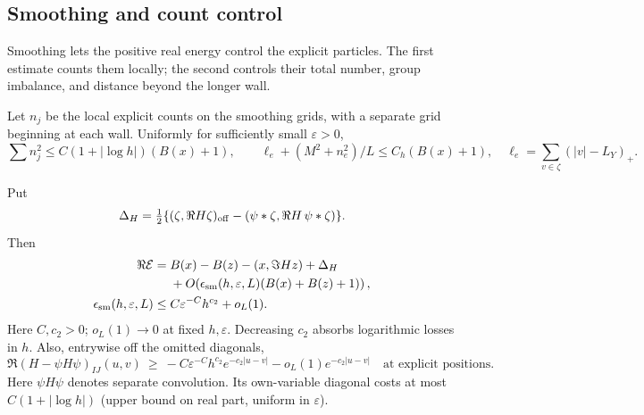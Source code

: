 \subsection{Smoothing and count control}

Smoothing lets the positive real energy control the explicit particles.
The first estimate counts them locally; the second controls their total
number, group imbalance, and distance beyond the longer wall.

\begin{lemma}\label{lem:07_magnetic_analysis-smoothing}
Let \(n_j\) be the local explicit counts on the smoothing grids, with a separate grid beginning at each wall. Uniformly for sufficiently small \(\varepsilon>0\),
\begin{equation}
 \sum n_j^2\le C(1+|\log h|)(B(x)+1),\qquad
 \ell_e+(M^2+n_e^2)/L\le C_h (B(x)+1),
 \quad\ell_e=\sum_{v\in\zeta}(|v|-L_Y)_+ .
 \label{eq:M-20}
\end{equation}


Put
\[
 \Delta_H=\tfrac12\{(\zeta,\Re H\zeta)_{\rm off}
                      -(\psi*\zeta,\Re H\,\psi*\zeta)\}.
\]
Then
\begin{equation}
\begin{aligned}
 \Re\mathcal E={}&B(x)-B(z)-(x,\Im H z)+\Delta_H
     \\ &+O\!\left(\epsilon_{\rm sm}(h,\varepsilon,L)(B(x)+B(z)+1)\right),\\
 \epsilon_{\rm sm}(h,\varepsilon,L)\le{}& C\varepsilon^{-C}h^{c_2}+o_L(1).
\end{aligned}
 \label{eq:M-21}
\end{equation}
Here \(C,c_2>0\); \(o_L(1)\to0\) at fixed \(h,\varepsilon\). Decreasing \(c_2\) absorbs logarithmic losses in \(h\). Also, entrywise off the omitted diagonals,
\begin{equation}
 \Re(H-\psi H\psi)_{IJ}(u,v)
 \ \ge\ -C\varepsilon^{-C}h^{c_2}e^{-c_2|u-v|}
            -o_L(1)e^{-c_2|u-v|}\quad\text{at explicit positions}.
 \label{eq:M-22}
\end{equation}
Here \(\psi H\psi\) denotes separate convolution. Its own-variable diagonal costs at most \(C(1+|\log h|)\) (upper bound on real part, uniform in \(\varepsilon\)).


\end{lemma}
